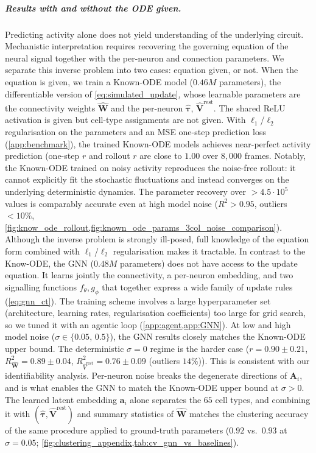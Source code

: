\documentclass{article}
\begin{document}
\subparagraph{Results with and without the ODE given.}
Predicting activity alone does not yield understanding of the underlying
circuit. Mechanistic interpretation requires recovering the governing
equation of the neural signal together with the per-neuron and
connection parameters. We separate this inverse problem into two cases: equation given, or not. When the equation is given, we train a Known-ODE model ($0.46M$ parameters), the
differentiable version of \cref{eq:simulated_update}, whose learnable
parameters are the connectivity weights $\hat{\mathbf{W}}$ and the per-neuron $\hat{\boldsymbol{\tau}}$, $\hat{\mathbf{V}}^{\mathrm{rest}}$. The shared ReLU
activation is given but cell-type assignments are not
given. With $\ell_1$/$\ell_2$ regularisation on the parameters and an
MSE one-step prediction loss (\cref{app:benchmark}), the trained 
Known-ODE models achieves near-perfect activity prediction (one-step $r$ and rollout $r$ are close to $1.00$ over $8{,}000$ frames. Notably, the Known-ODE trained on noisy activity reproduces the noise-free rollout: it cannot explicitly fit the stochastic fluctuations and instead converges on the underlying
deterministic dynamics. The parameter recovery over $> 4.5\cdot 10^5$
values is comparably accurate even at high model noise ($R^2>0.95$, outliers $<10\%$, \cref{fig:know_ode_rollout,fig:known_ode_params_3col_noise_comparison}).
Although the inverse problem is strongly ill-posed, full knowledge
of the equation form combined with $\ell_1$/$\ell_2$ regularisation
makes it tractable.
In contrast to the Know-ODE, the GNN ($0.48 M$ parameters) does not have access to the update equation. It learns jointly the connectivity, a per-neuron embedding, and two
signalling functions $f_\theta, g_\phi$ that together express a wide
family of update rules (\cref{eq:gnn_ct}). The training scheme involves a large hyperparameter set (architecture, learning rates, regularisation coefficients) too large
for grid search, so we tuned it with an agentic loop (\cref{app:agent,app:GNN}). At low and high model noise ($\sigma \in \{0.05,\,0.5\}$), the GNN results closely matches the Known-ODE upper bound. The deterministic
$\sigma=0$ regime is the harder case ($r=0.90\pm 0.21$,
$R^2_{\hat{\mathbf{W}}}=0.89\pm 0.04$, $R^2_{\hat{V}^{\mathrm{rest}}}=0.76\pm 0.09$ (outliers $14\%$)). This is consistent with our identifiability analysis. Per-neuron
noise breaks the degenerate directions of $\mathbf{A}_i$, and is
what enables the GNN to match the Known-ODE upper bound at
$\sigma > 0$. The learned latent embedding $\mathbf{a}_i$ alone separates the $65$
cell types, and combining it with $(\hat{\boldsymbol{\tau}},
\hat{\mathbf{V}}^{\mathrm{rest}})$ and summary statistics of
$\hat{\mathbf{W}}$ matches the clustering accuracy of the same
procedure applied to ground-truth parameters
($0.92$ vs.\ $0.93$ at $\sigma = 0.05$;
\cref{fig:clustering_appendix,tab:cv_gnn_vs_baselines}).
\end{document}
